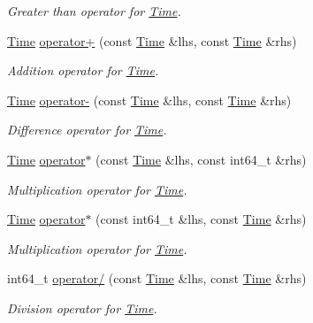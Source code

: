 \begin{DoxyCompactItemize}
\begin{DoxyCompactList}\small\item\em Greater than operator for \hyperlink{classns3_1_1Time}{Time}. \end{DoxyCompactList}\item 
\hyperlink{classns3_1_1Time}{Time} \hyperlink{classns3_1_1Time_ad0fe627a4c71d16584985ab1393b1ff4}{operator+} (const \hyperlink{classns3_1_1Time}{Time} \&lhs, const \hyperlink{classns3_1_1Time}{Time} \&rhs)
\begin{DoxyCompactList}\small\item\em Addition operator for \hyperlink{classns3_1_1Time}{Time}. \end{DoxyCompactList}\item 
\hyperlink{classns3_1_1Time}{Time} \hyperlink{classns3_1_1Time_aceb30dc84445ccf4cba2fd09e6b49939}{operator-\/} (const \hyperlink{classns3_1_1Time}{Time} \&lhs, const \hyperlink{classns3_1_1Time}{Time} \&rhs)
\begin{DoxyCompactList}\small\item\em Difference operator for \hyperlink{classns3_1_1Time}{Time}. \end{DoxyCompactList}\item 
\hyperlink{classns3_1_1Time}{Time} \hyperlink{classns3_1_1Time_aee71d75f64c94f6563e680b212c418bf}{operator$\ast$} (const \hyperlink{classns3_1_1Time}{Time} \&lhs, const int64\+\_\+t \&rhs)
\begin{DoxyCompactList}\small\item\em Multiplication operator for \hyperlink{classns3_1_1Time}{Time}. \end{DoxyCompactList}\item 
\hyperlink{classns3_1_1Time}{Time} \hyperlink{classns3_1_1Time_a1a12784865015698af6bf5c3ad268d01}{operator$\ast$} (const int64\+\_\+t \&lhs, const \hyperlink{classns3_1_1Time}{Time} \&rhs)
\begin{DoxyCompactList}\small\item\em Multiplication operator for \hyperlink{classns3_1_1Time}{Time}. \end{DoxyCompactList}\item 
int64\+\_\+t \hyperlink{classns3_1_1Time_aad92e49e90f6050adc0ed4dcbed2581f}{operator/} (const \hyperlink{classns3_1_1Time}{Time} \&lhs, const \hyperlink{classns3_1_1Time}{Time} \&rhs)
\begin{DoxyCompactList}\small\item\em Division operator for \hyperlink{classns3_1_1Time}{Time}. \end{DoxyCompactList}\item 

\end{DoxyCompactItemize}
